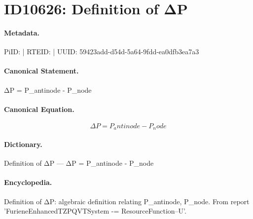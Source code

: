 \section*{ID10626: Definition of ΔP}
\paragraph{Metadata.}
PiID:  | RTEID:  | UUID: 59423add-d54d-5a64-9fdd-ea0dfb3ea7a3

\paragraph{Canonical Statement.}
ΔP = P\_antinode - P\_node

\paragraph{Canonical Equation.}
\[
ΔP = P_antinode - P_node
\]

\paragraph{Dictionary.}
Definition of ΔP — ΔP = P\_antinode - P\_node

\paragraph{Encyclopedia.}
Definition of ΔP: algebraic definition relating P\_antinode, P\_node. From report 'FurieneEnhancedTZPQVTSystem -= ResourceFunction--U'.
